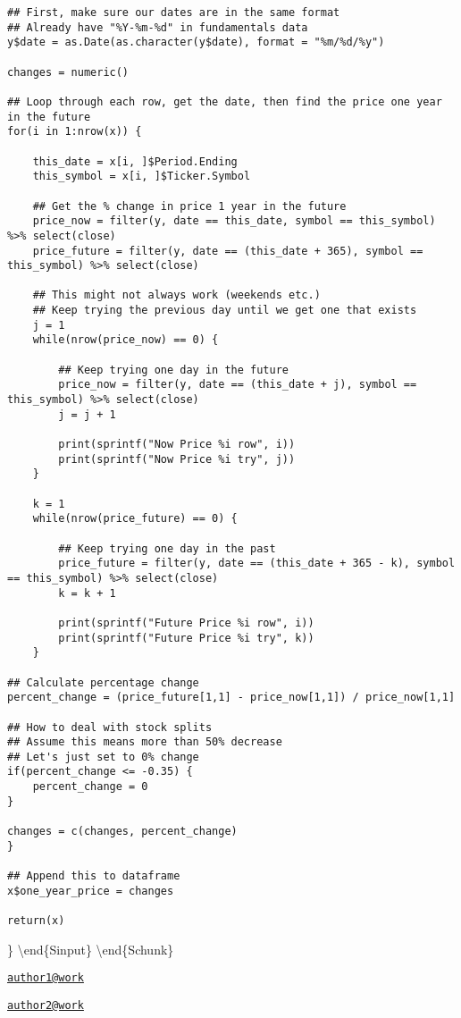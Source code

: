 \begin{verbatim}
## First, make sure our dates are in the same format 
## Already have "%Y-%m-%d" in fundamentals data 
y$date = as.Date(as.character(y$date), format = "%m/%d/%y")

changes = numeric()

## Loop through each row, get the date, then find the price one year in the future 
for(i in 1:nrow(x)) {
    
    this_date = x[i, ]$Period.Ending
    this_symbol = x[i, ]$Ticker.Symbol
    
    ## Get the % change in price 1 year in the future 
    price_now = filter(y, date == this_date, symbol == this_symbol) %>% select(close)
    price_future = filter(y, date == (this_date + 365), symbol == this_symbol) %>% select(close)
    
    ## This might not always work (weekends etc.)
    ## Keep trying the previous day until we get one that exists 
    j = 1
    while(nrow(price_now) == 0) {
        
        ## Keep trying one day in the future 
        price_now = filter(y, date == (this_date + j), symbol == this_symbol) %>% select(close)
        j = j + 1
        
        print(sprintf("Now Price %i row", i))
        print(sprintf("Now Price %i try", j))
    }
    
    k = 1
    while(nrow(price_future) == 0) {
        
        ## Keep trying one day in the past 
        price_future = filter(y, date == (this_date + 365 - k), symbol == this_symbol) %>% select(close)
        k = k + 1
        
        print(sprintf("Future Price %i row", i))
        print(sprintf("Future Price %i try", k))
    }
    
## Calculate percentage change
percent_change = (price_future[1,1] - price_now[1,1]) / price_now[1,1]

## How to deal with stock splits 
## Assume this means more than 50% decrease 
## Let's just set to 0% change 
if(percent_change <= -0.35) {
    percent_change = 0
}

changes = c(changes, percent_change)
}

## Append this to dataframe 
x$one_year_price = changes 

return(x)
\end{verbatim}

\} \textbackslash{}end\{Sinput\} \textbackslash{}end\{Schunk\}

\address{%
Jackson Moss\\
Affiliation\\
line 1\\ line 2\\
}
\href{mailto:author1@work}{\nolinkurl{author1@work}}

\address{%
Author Two\\
Affiliation\\
line 1\\ line 2\\
}
\href{mailto:author2@work}{\nolinkurl{author2@work}}

